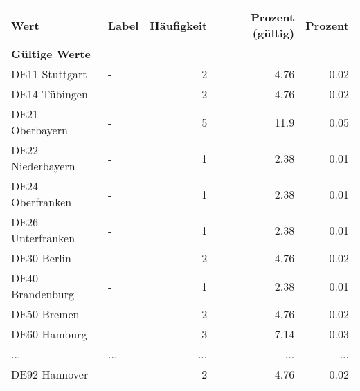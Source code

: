      \begin{longtable}{Xlrrr}
     \toprule
     \textbf{Wert} & \textbf{Label} & \textbf{Häufigkeit} & \textbf{Prozent (gültig)} & \textbf{Prozent} \\
     \endhead
     \midrule
     \multicolumn{5}{l}{\textbf{Gültige Werte}}\\
        \multicolumn{1}{X}{DE11 Stuttgart} & - & \num{2} & \num[round-mode=places,round-precision=2]{4.76} & \num[round-mode=places,round-precision=2]{0.02} \\
        \multicolumn{1}{X}{DE14 Tübingen} & - & \num{2} & \num[round-mode=places,round-precision=2]{4.76} & \num[round-mode=places,round-precision=2]{0.02} \\
        \multicolumn{1}{X}{DE21 Oberbayern} & - & \num{5} & \num[round-mode=places,round-precision=2]{11.9} & \num[round-mode=places,round-precision=2]{0.05} \\
        \multicolumn{1}{X}{DE22 Niederbayern} & - & \num{1} & \num[round-mode=places,round-precision=2]{2.38} & \num[round-mode=places,round-precision=2]{0.01} \\
        \multicolumn{1}{X}{DE24 Oberfranken} & - & \num{1} & \num[round-mode=places,round-precision=2]{2.38} & \num[round-mode=places,round-precision=2]{0.01} \\
        \multicolumn{1}{X}{DE26 Unterfranken} & - & \num{1} & \num[round-mode=places,round-precision=2]{2.38} & \num[round-mode=places,round-precision=2]{0.01} \\
        \multicolumn{1}{X}{DE30 Berlin} & - & \num{2} & \num[round-mode=places,round-precision=2]{4.76} & \num[round-mode=places,round-precision=2]{0.02} \\
        \multicolumn{1}{X}{DE40 Brandenburg} & - & \num{1} & \num[round-mode=places,round-precision=2]{2.38} & \num[round-mode=places,round-precision=2]{0.01} \\
        \multicolumn{1}{X}{DE50 Bremen} & - & \num{2} & \num[round-mode=places,round-precision=2]{4.76} & \num[round-mode=places,round-precision=2]{0.02} \\
        \multicolumn{1}{X}{DE60 Hamburg} & - & \num{3} & \num[round-mode=places,round-precision=2]{7.14} & \num[round-mode=places,round-precision=2]{0.03} \\
       ... & ... & ... & ... & ... \\
        \multicolumn{1}{X}{DE92 Hannover} & - & \num{2} & \num[round-mode=places,round-precision=2]{4.76} & \num[round-mode=places,round-precision=2]{0.02} \\

\end{longtable}
